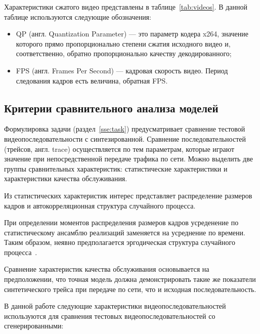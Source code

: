 Характеристики сжатого видео представлены в таблице~\ref{tab:videos}.
В данной таблице используются следующие обозначения:
\begin{itemize}
    \item QP (англ. Quantization Parameter) --- это параметр кодера x264,
        значение которого прямо пропорционально степени сжатия исходного видео
        и, соответственно, обратно пропорционально качеству декодированного;
    \item FPS (англ. Frames Per Second) --- кадровая скорость видео. Период
        следования кадров есть величина, обратная FPS.
\end{itemize}


\subsection{Критерии сравнительного анализа моделей}

Формулировка задачи (раздел~\ref{sse:task}) предусматривает
сравнение тестовой видеопоследовательности с синтезированной.
Сравнение последовательностей (трейсов, англ. trace) осуществляется
по тем параметрам, которые играют значение при непосредственной
передаче трафика по сети. Можно выделить две группы сравнительных
характеристик: статистические характеристики и характеристики качества
обслуживания.

Из статистических характеристик интерес представляет распределение
размеров кадров и автокорреляционная структура случайного процесса.

При определении моментов распределения размеров кадров усреденение
по статистическому ансамблю реализаций заменяется на усреднение
по времени. Таким образом, неявно предполагается эргодическая
структура случайного процесса~\cite{ergodic}.

Сравнение характеристик качества обслуживания основывается
на предположении, что точная модель должна демонстрировать
такие же показатели синтетического трейса при передаче по
сети, что и исходная последовательность.

В данной работе следующие характеристики видеопоследовательностей
используются для сравнения тестовых видеопоследовательностей
со сгенерированными:

